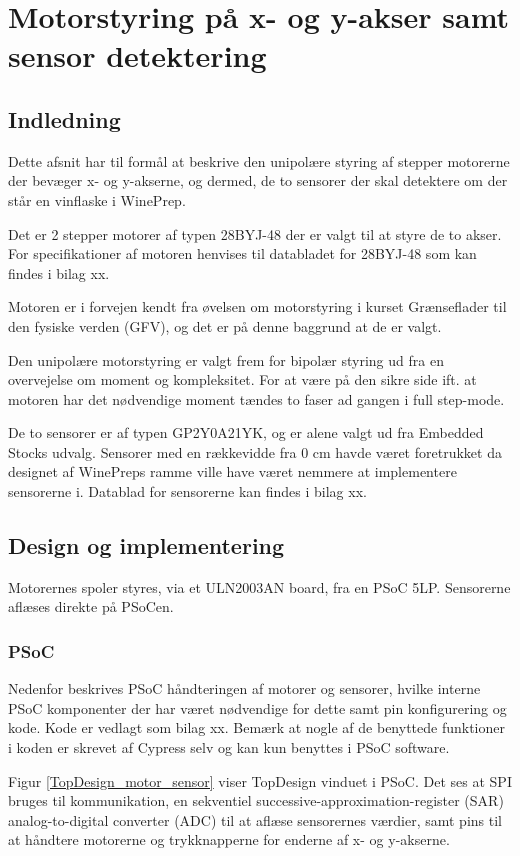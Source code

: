 ﻿\chapter{Motorstyring på x- og y-akser samt sensor detektering}
\section{Indledning}
Dette afsnit har til formål at beskrive den unipolære styring af stepper motorerne der bevæger x- og y-akserne, og dermed, de to sensorer der skal detektere om der står en vinflaske i WinePrep.

Det er 2 stepper motorer af typen 28BYJ-48 der er valgt til at styre de to akser. For specifikationer af motoren henvises til databladet for 28BYJ-48 som kan findes i bilag xx.

Motoren er i forvejen kendt fra øvelsen om motorstyring i kurset Grænseflader til den fysiske verden (GFV), og det er på denne baggrund at de er valgt.

Den unipolære motorstyring er valgt frem for bipolær styring ud fra en overvejelse om moment og kompleksitet. For at være på den sikre side ift. at motoren har det nødvendige moment tændes to faser ad gangen i full step-mode.

De to sensorer er af typen GP2Y0A21YK, og er alene valgt ud fra Embedded Stocks udvalg. Sensorer med en rækkevidde fra 0 cm havde været foretrukket da designet af WinePreps ramme ville have været nemmere at implementere sensorerne i. Datablad for sensorerne kan findes i bilag xx.

\section{Design og implementering}
Motorernes spoler styres, via et ULN2003AN board, fra en PSoC 5LP. Sensorerne aflæses direkte på PSoCen.

\subsection{PSoC}
Nedenfor beskrives PSoC håndteringen af motorer og sensorer, hvilke interne PSoC komponenter der har været nødvendige for dette samt pin konfigurering og kode. Kode er vedlagt som bilag xx. Bemærk at nogle af de benyttede funktioner i koden er skrevet af Cypress selv og kan kun benyttes i PSoC software.

Figur \ref{TopDesign_motor_sensor} viser TopDesign vinduet i PSoC. Det ses at SPI bruges til kommunikation, en sekventiel successive-approximation-register (SAR) analog-to-digital converter (ADC) til at aflæse sensorernes værdier, samt pins til at håndtere motorerne og trykknapperne for enderne af x- og y-akserne.

